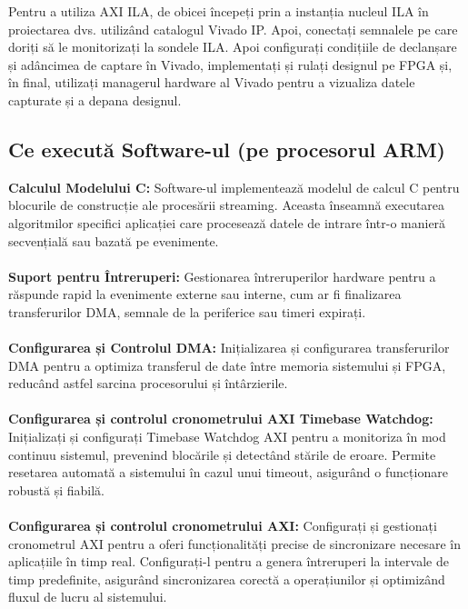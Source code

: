 \documentclass[12pt]{article}
\begin{document}
\hspace*{1cm}Pentru a utiliza AXI ILA, de obicei începeți prin a instanția nucleul ILA în proiectarea dvs. utilizând catalogul Vivado IP. Apoi, conectați semnalele pe care doriți să le monitorizați la sondele ILA. Apoi configurați condițiile de declanșare și adâncimea de captare în Vivado, implementați și rulați designul pe FPGA și, în final, utilizați managerul hardware al Vivado pentru a vizualiza datele capturate și a depana designul.



\subsection{Ce execută Software-ul (pe procesorul ARM)}
\hspace*{1cm}\textbf{Calculul Modelului C:} Software-ul implementează modelul de calcul C pentru blocurile de construcție ale procesării streaming. Aceasta înseamnă executarea algoritmilor specifici aplicației care procesează datele de intrare într-o manieră secvențială sau bazată pe evenimente.\\\\
\hspace*{1cm}\textbf{Suport pentru Întreruperi:} Gestionarea întreruperilor hardware pentru a răspunde rapid la evenimente externe sau interne, cum ar fi finalizarea transferurilor DMA, semnale de la periferice sau timeri expirați.\\\\
\hspace*{1cm}\textbf{Configurarea și Controlul DMA:} Inițializarea și configurarea transferurilor DMA pentru a optimiza transferul de date între memoria sistemului și FPGA, reducând astfel sarcina procesorului și întârzierile.\\\\
\hspace*{1cm}\textbf{Configurarea și controlul cronometrului AXI Timebase Watchdog:} Inițializați și configurați Timebase Watchdog AXI pentru a monitoriza în mod continuu sistemul, prevenind blocările și detectând stările de eroare. Permite resetarea automată a sistemului în cazul unui timeout, asigurând o funcționare robustă și fiabilă.\\\\
\hspace*{1cm}\textbf{Configurarea și controlul cronometrului AXI:} Configurați și gestionați cronometrul AXI pentru a oferi funcționalități precise de sincronizare necesare în aplicațiile în timp real. Configurați-l pentru a genera întreruperi la intervale de timp predefinite, asigurând sincronizarea corectă a operațiunilor și optimizând fluxul de lucru al sistemului.\\\\
\end{document}
